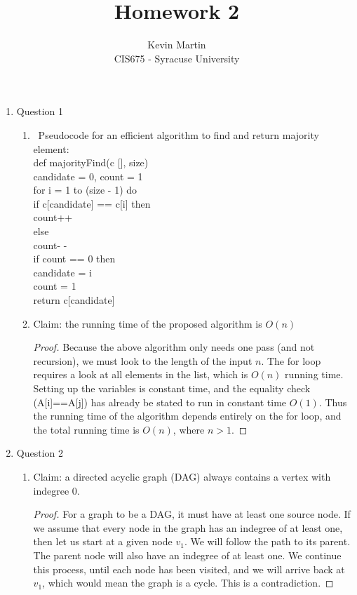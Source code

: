 \documentclass{article}
\author{Kevin Martin\\ CIS675 - Syracuse University}
\title{Homework 2}
\newcommand\tab[1][1cm]{\hspace*{#1}}
\begin{document}
\maketitle
\begin{enumerate}
    \item Question 1
      \begin{enumerate}
    \item \ Pseudocode for an efficient algorithm to find and return majority element:\\
      def majorityFind(c [], size)\\
      candidate = 0, count = 1\\
      for i = 1 to (size - 1) do\\
      \tab if c[candidate] == c[i] then\\
           \tab \tab count++\\
       \tab else\\
        \tab \tab count- -\\
       \tab if count == 0 then\\
         \tab \tab candidate = i\\
          \tab \tab count = 1\\
      return c[candidate]\\

    
    \item Claim: the running time of the proposed algorithm is $O(n)$
      \begin{proof}
        Because the above algorithm only needs one pass (and not recursion),
        we must look to the length of the input $n$. The for loop requires a 
        look at all elements in the list, which is $O(n)$ running time.
        Setting up the variables is constant time, and the equality check 
        (A[i]==A[j]) has already be stated to run in constant time $O(1)$.
        Thus the running time of the algorithm depends entirely on the 
        for loop, and the total running time is $O(n)$, where $n>1$.

      \end{proof}

  \end{enumerate}
    \item Question 2
      \begin{enumerate}
        \item Claim: a directed acyclic graph (DAG) always contains a vertex with indegree 0.
      \begin{proof}
      For a graph to be a DAG, it must have at least one source node. If we assume that every
        node in the graph has an indegree of at least one, then let us start at a given node $v_{1}$.
        We will follow the path to its parent. The parent node will also have an indegree of 
        at least one. We continue this process, until each node has been visited, and we will arrive
        back at $v_{1}$, which would mean the graph is a cycle. This is a contradiction.


\end{proof}
\end{enumerate}
\end{enumerate}
\end{document}
